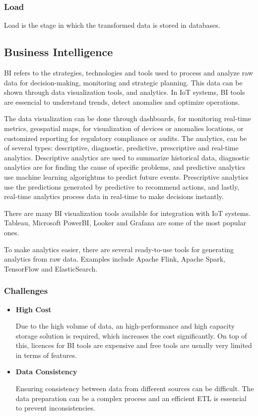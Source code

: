\subsubsection{Load}
Load is the stage in which the transformed data is stored in databases.

\subsection{Business Intelligence}
\gls{BI} refers to the strategies, technologies and tools used to process and
analyze raw data for decision-making, monitoring and strategic planning.
This data can be shown through data visualization tools, and analytics.
In IoT systems, \gls{BI} tools are essencial to understand trends, detect
anomalies and optimize operations.

The data visualization can be done through dashboards, for monitoring real-time
metrics, geospatial maps, for visualization of devices or anomalies locations,
or customized reporting for regulatory compliance or audits. The analytics, can
be of several types: descriptive, diagnostic, predictive, prescriptive and
real-time analytics. Descriptive analytics are used to summarize historical
data, diagnostic analytics are for finding the cause of specific problems, and
predictive analytics use machine learning algorightms to predict future events.
Prescriptive analytics use the predictions generated by predictive to recommend
actions, and lastly, real-time analytics process data in real-time to make
decisions instantly.

There are many \gls{BI} visualization tools available for integration with IoT systems.
Tableau, Microsoft PowerBI, Looker and Grafana are some of the most popular ones.

To make analytics easier, there are several ready-to-use tools for generating
analytics from raw data. Examples include Apache Flink, Apache Spark,
TensorFlow and ElasticSearch.
\subsubsection{Challenges}

\begin{itemize}
	\item \textbf{High Cost}

	      Due to the high volume of data, an high-performance and high capacity storage
	      solution is required, which increases the cost significantly. On top of this,
	      licences for \gls{BI} tools are expensive and free tools are usually very
	      limited in terms of features.

	\item \textbf{Data Consistency}

	      Ensuring consistency between data from different sources can be difficult.
	      The data preparation can be a complex process and an efficient \gls{ETL} is
	      essencial to prevent inconsistencies.

\end{itemize}


